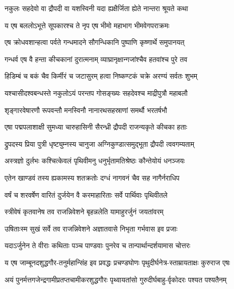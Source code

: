 \twolineshloka
{नकुलः सहदेवो वा द्रौपदी वा यशस्विनी}
{यदा ह्यक्षैर्जिता ह्येते नान्तरा श्रूयते कथा}




\twolineshloka
{य एष बललोऽभूत्ते सूपकारश्च ते नृप}
{एष भीमो महाभाग भीमवेगपराक्रमः}


\twolineshloka
{एष क्रोधवशान्हत्वा पर्वते गन्धमादने}
{सौगन्धिकानि पुष्पाणि कृष्णार्थे समुपानयत्}


\twolineshloka
{गन्धर्व एष वै हन्ता कीचकानां दुरात्मनाम्}
{व्याघ्रानृक्षान्गजांश्चैव हतवांश्च पुरे तव}


\twolineshloka
{हिडिम्बं च बकं चैव किर्मीरं च जटासुरम्}
{हत्वा निष्कण्टकं चक्रे अरण्यं सर्वतः शुभम्}


\twolineshloka
{यश्चासीदश्वबन्धस्ते नकुलोऽयं परन्तप}
{गोसङ्ख्यः सहदेवश्च माद्रीपुत्रौ महाबलौ}


\twolineshloka
{शृङ्गारवेषारणौ रूपवन्तौ मनस्विनौ}
{नानारथसहस्राणां समर्थौ भरतर्षभौ}


\twolineshloka
{एषा पद्मपलाशाक्षी सुमध्या चारुहासिनी}
{सैरन्ध्री द्रौपदी राजन्यकृते कीचका हताः}


\twolineshloka
{द्रुपदस्य प्रिया पुत्री धृष्ट्युम्नस्य चानुजा}
{अग्निकुण्डात्समुद्भूता द्रौपदी त्ववगम्यताम्}



\twolineshloka
{अस्त्रज्ञो दुर्लभः कश्चित्केवलं पृथिवीमनु}
{धनुर्भृतामतिश्रेष्ठः कौन्तेयोयं धनञ्जयः}


\twolineshloka
{एतेन खाण्डवं तस्य ह्यकामस्य शतक्रतोः}
{दग्धं नागवनं चैव सह नागैर्नराधिप}


\twolineshloka
{वर्षं च शरवर्षेण वारितं दुर्जयेन वै}
{करमाहारिताः सर्वे पार्थिवाः पृथिवीतले}


\twolineshloka
{स्त्रीवेषं कृतवानेष तव राजन्निवेशने}
{बृहन्नलेति यामाहुरर्जुनं जयतांवरम्}


\twolineshloka
{उषिताःस्म सुखं सर्वे तव राजन्निवेशने}
{अज्ञातवासे निभृता गर्भवास इव प्रजाः}



\twolineshloka
{यदाऽर्जुनेन ते वीराः कथिताः पञ्च पाण्डवाः}
{पुनरेव च तान्पार्थान्दर्शयामास चोत्तरः}




\twolineshloka
{य एष जाम्बूनदशुद्धगौर-तनुर्महान्सिंह इव प्रवद्धः}
{प्रचण्डघोणः पृथुदीर्घनेत्र-स्ताम्रायताक्षः कुरुराज एषः}


\twolineshloka
{अयं पुनर्मत्तगजेन्द्रगामीप्रतप्तचामीकरशुद्धगौरः}
{पृथ्वायतांसो गुरुदीर्घबाहु-र्वृकोदरः पश्यत पश्यतैनम्}



